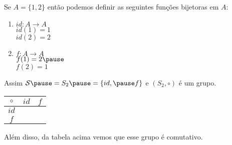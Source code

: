 \documentclass{beamer}
\begin{document}
    \begin{frame}
        Se $A = \{1, 2\}$ \pause ent\~ao podemos definir as seguintes fun\c{c}\~oes bijetoras em $A$: \pause
        \begin{multicols}{2}
            \begin{enumerate}
                \item[] \begin{center}
                    $id : A \to A$ \pause\\
                    $id(1) = 1$ \pause\\ $id(2) = 2$
                \end{center}\pause
                \item[]  \begin{center}
                    $f : A \to A$ \pause\\ $f(1) = 2 \pause$\\ $f(2) = 1$
                \end{center}\pause
            \end{enumerate}
        \end{multicols}

        Assim $\mathcal{S} \pause = S_2 \pause = \{id, \pause f\}$ \pause e $(S_2, \circ)$ \'e um grupo.\pause

        \begin{table}[!htb]
        \centering
            \begin{tabular}{|c|c|c|} 
                \hline
                $\circ$ & $id$ & $f$\T\\
                \hline
                $id$ & \phantom{xyz} & \phantom{xyz}\T\\
                \hline
                $f$ & \phantom{xyz} & \phantom{xyz}\T\\
                \hline
            \end{tabular}
        \end{table}\pause

        Al\'em disso, da tabela acima vemos que esse grupo \'e comutativo.
    \end{frame}
\end{document}
